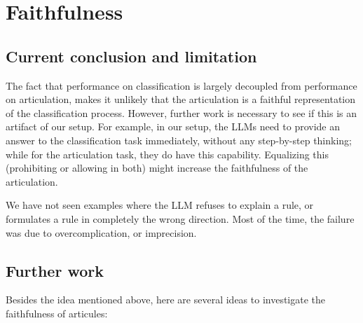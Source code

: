 \documentclass{article}
\begin{document}


\section{Faithfulness}


\subsection{Current conclusion and limitation}

The fact that performance on classification is largely decoupled from performance on articulation,
makes it unlikely that the articulation is a faithful representation of
the classification process.
However, further work is necessary to see if this is an artifact of our setup.
For example, in our setup,
the LLMs need to provide an answer to the classification task
immediately, without any step-by-step thinking;
while for the articulation task, they do have this capability.
Equalizing this (prohibiting or allowing in both)
might increase the faithfulness of the articulation.

We have not seen examples where the LLM refuses to explain a rule, or
formulates a rule in completely the wrong direction.
Most of the time, the failure was due to overcomplication,
or imprecision.

\subsection{Further work}

Besides the idea mentioned above, here are several ideas to investigate
the faithfulness of articules:
\end{document}
